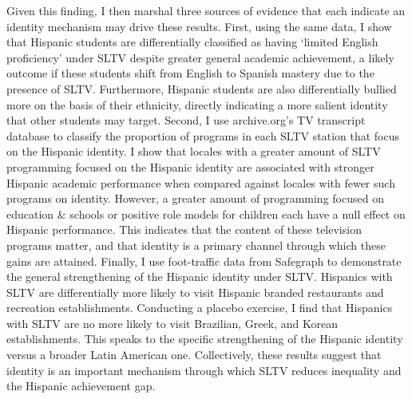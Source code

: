 \documentclass[11pt]{article}
\begin{document}
Given this finding, I then marshal three sources of evidence that each indicate an identity mechanism may drive these results. First, using the same data, I show that Hispanic students are differentially classified as having ‘limited English proficiency’ under SLTV despite greater general academic achievement, a likely outcome if these students shift from English to Spanish mastery due to the presence of SLTV. Furthermore, Hispanic students are also differentially bullied more on the basis of their ethnicity, directly indicating a more salient identity that other students may target. Second, I use archive.org’s TV transcript database to classify the proportion of programs in each SLTV station that focus on the Hispanic identity. I show that locales with a greater amount of SLTV programming focused on the Hispanic identity are associated with stronger Hispanic academic performance when compared against locales with fewer such programs on identity. However, a greater amount of programming focused on education \& schools or positive role models for children each have a null effect on Hispanic performance. This indicates that the content of these television programs matter, and that identity is a primary channel through which these gains are attained. Finally, I use foot-traffic data from Safegraph to demonstrate the general strengthening of the Hispanic identity under SLTV. Hispanics with SLTV are differentially more likely to visit Hispanic branded restaurants and recreation establishments. Conducting a placebo exercise, I find that Hispanics with SLTV are no more likely to visit Brazilian, Greek, and Korean establishments. This speaks to the specific strengthening of the Hispanic identity versus a broader Latin American one. Collectively, these results suggest that identity is an important mechanism through which SLTV reduces inequality and the Hispanic achievement gap. 
\end{document}

